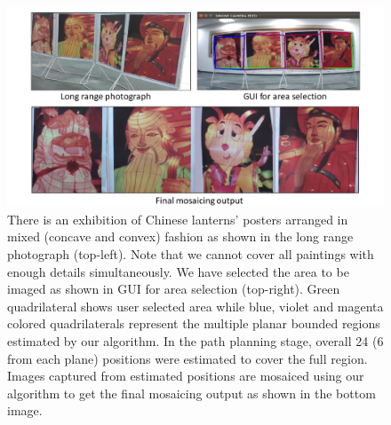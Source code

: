 \begin{figure}
\centering
\includegraphics[width=\linewidth]{figures/multiplanar/mixed2Result.pdf}
\caption[Result: Mixed arrangement]{There is an exhibition of Chinese lanterns'
posters arranged in mixed (concave and convex) fashion as shown in the long range photograph
(top-left). Note that we cannot cover all paintings with enough details
simultaneously. We have selected the area to be imaged as shown in GUI for
area selection (top-right). Green quadrilateral shows user selected area while
blue, violet and magenta colored quadrilaterals represent the multiple
planar bounded regions estimated by our algorithm. In the path planning
stage, overall 24 (6 from each plane) positions were estimated to cover the full
region. Images captured from estimated positions are mosaiced using our
algorithm to get the final mosaicing output as shown in the bottom image.}
\label{fig:resultMixed2}
\end{figure}

